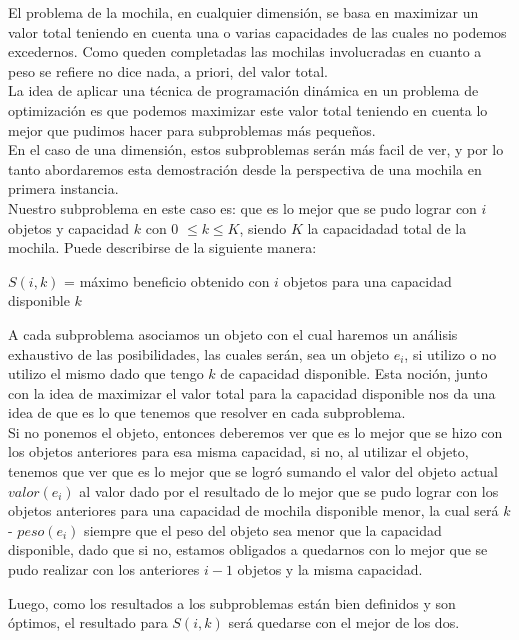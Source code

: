 El problema de la mochila, en cualquier dimensi\'on, se basa en maximizar un valor total teniendo en cuenta una o varias capacidades de las cuales no podemos excedernos. Como queden completadas las mochilas involucradas en cuanto a peso se refiere no dice nada, a priori, del valor total.\\

La idea de aplicar una t\'ecnica de programación dinámica en un problema de optimización es que podemos maximizar este valor total teniendo en cuenta lo mejor que pudimos hacer para subproblemas m\'as pequeños.\\

En el caso de una dimensi\'on, estos subproblemas serán más facil de ver, y por lo tanto abordaremos esta demostración desde la perspectiva de una mochila en primera instancia.\\

Nuestro subproblema en este caso es: que es lo mejor que se pudo lograr con $i$ objetos y capacidad $k$ con 0 $\leq k \leq K$, siendo $K$ la capacidadad total de la mochila.
Puede describirse de la siguiente manera:

\begin{center}
$S(i, k)$ = máximo beneficio obtenido con $i$ objetos para una capacidad disponible $k$
\end{center}

A cada subproblema asociamos un objeto con el cual haremos un análisis exhaustivo de las posibilidades, las cuales serán, sea un objeto $e_i$, si utilizo o no utilizo el mismo dado que tengo $k$ de capacidad disponible.
Esta noción, junto con la idea de maximizar el valor total para la capacidad disponible nos da una idea de que es lo que tenemos que resolver en cada subproblema. \\

Si no ponemos el objeto, entonces deberemos ver que es lo mejor que se hizo con los objetos anteriores para esa misma capacidad, si no, al utilizar el objeto, tenemos que ver que es lo mejor que se logró sumando el valor del objeto actual $valor(e_i)$ al valor dado por el resultado de lo mejor que se pudo lograr con los objetos anteriores para una capacidad de mochila disponible menor, la cual será $k$ - $peso(e_i)$ siempre que el peso del objeto sea menor que la capacidad disponible, dado que si no, estamos obligados a quedarnos con lo mejor que se pudo realizar con los anteriores $i-1$ objetos y la misma capacidad.

Luego, como los resultados a los subproblemas están bien definidos y son óptimos, el resultado para $S(i, k)$ será quedarse con el mejor de los dos.

